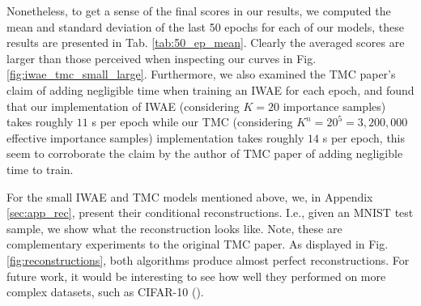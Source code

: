 Nonetheless, to get a sense of the final scores in our results, we computed the mean and standard deviation of the last 50 epochs for each of our models, these results are presented in Tab. \ref{tab:50_ep_mean}. Clearly the averaged scores are larger than those perceived when inspecting our curves in Fig. \ref{fig:iwae_tmc_small_large}. Furthermore, we also examined the TMC paper's claim of adding negligible time when training an IWAE for each epoch, and found that our implementation of IWAE (considering $K=20$ importance samples) takes roughly $11$ s per epoch while our TMC (considering $K^n=20^5=3,200,000$ effective importance samples) implementation takes roughly $14$ s per epoch, this seem to corroborate the claim by the author of TMC paper of adding negligible time to train. 

For the small IWAE and TMC models mentioned above, we, in Appendix \ref{sec:app_rec}, present their conditional reconstructions. I.e., given an MNIST test sample, we show what the reconstruction looks like. Note, these are complementary experiments to the original TMC paper. As displayed in Fig. \ref{fig:reconstructions}, both algorithms produce almost perfect reconstructions. For future work, it would be interesting to see how well they performed on more complex datasets, such as CIFAR-10 (\cite{cifar10}).
